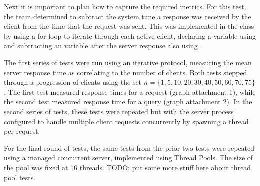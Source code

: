 Next it is important to plan how to capture the required metrics. For this test, the team determined to subtract the system time a response was received by the client from the time that the request was sent. This was implemented in the class  by using a for-loop to iterate through each active client, declaring a  variable using  and subtracting an  variable after the server response also using . 

The first series of tests were run using an iterative protocol, measuring the mean server response time as correlating to the number of clients. Both tests stepped through a progression of clients  using the set  $n = \{1, 5, 10, 20, 30, 40, 50, 60, 70, 75\}$.  The first test measured response times for a  request (graph attachment 1), while the second test measured response time for a  query (graph attachment 2). In the second series of tests, these tests were repeated but with the server process configured to handle multiple client requests concurrently by spawning a thread per request.

For the final round of tests, the same tests from the prior two tests were repeated using a managed concurrent server, implemented using Thread Pools. The size of the pool was fixed at 16 threads.
TODO: put some more stuff here about thread pool tests.